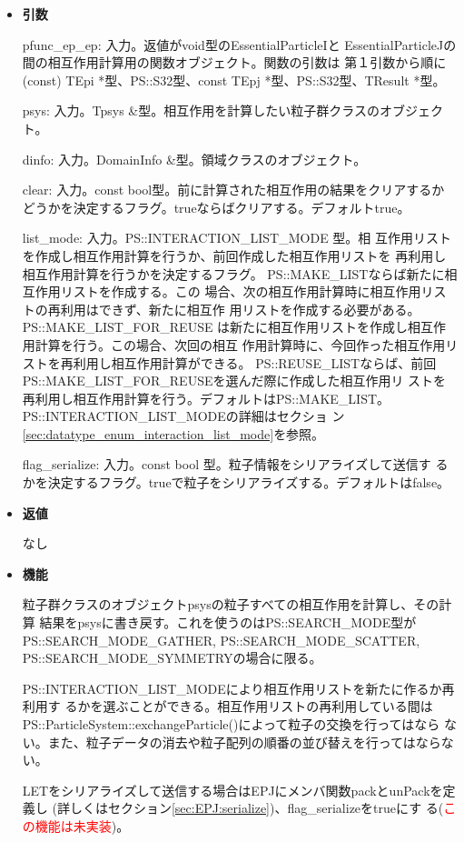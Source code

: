 \begin{itemize}

\item {\bf 引数}

pfunc\_ep\_ep: 入力。返値がvoid型のEssentialParticleIと
EssentialParticleJの間の相互作用計算用の関数オブジェクト。関数の引数は
第１引数から順に(const) TEpi *型、PS::S32型、const
TEpj *型、PS::S32型、TResult *型。

psys: 入力。Tpsys \&型。相互作用を計算したい粒子群クラスのオブジェクト。

dinfo: 入力。DomainInfo \&型。領域クラスのオブジェクト。

clear: 入力。const bool型。前に計算された相互作用の結果をクリアするか
どうかを決定するフラグ。trueならばクリアする。デフォルトtrue。

list\_mode: 入力。PS::INTERACTION\_LIST\_MODE 型。相
互作用リストを作成し相互作用計算を行うか、前回作成した相互作用リストを
再利用し相互作用計算を行うかを決定するフラグ。
PS::MAKE\_LISTならば新たに相互作用リストを作成する。この
場合、次の相互作用計算時に相互作用リストの再利用はできず、新たに相互作
用リストを作成する必要がある。PS::MAKE\_LIST\_FOR\_REUSE
は新たに相互作用リストを作成し相互作用計算を行う。この場合、次回の相互
作用計算時に、今回作った相互作用リストを再利用し相互作用計算ができる。
PS::REUSE\_LISTならば、前回
PS::MAKE\_LIST\_FOR\_REUSEを選んだ際に作成した相互作用リ
ストを再利用し相互作用計算を行う。デフォルトはPS::MAKE\_LIST。
PS::INTERACTION\_LIST\_MODEの詳細はセクショ
ン\ref{sec:datatype_enum_interaction_list_mode}を参照。

flag\_serialize: 入力。const bool 型。粒子情報をシリアライズして送信す
るかを決定するフラグ。trueで粒子をシリアライズする。デフォルトはfalse。

\item {\bf 返値}

なし

\item {\bf 機能}

粒子群クラスのオブジェクトpsysの粒子すべての相互作用を計算し、その計算
結果をpsysに書き戻す。これを使うのはPS::SEARCH\_MODE型が
PS::SEARCH\_MODE\_GATHER, PS::SEARCH\_MODE\_SCATTER,
PS::SEARCH\_MODE\_SYMMETRYの場合に限る。

PS::INTERACTION\_LIST\_MODEにより相互作用リストを新たに作るか再利用す
るかを選ぶことができる。相互作用リストの再利用している間は
PS::ParticleSystem::exchangeParticle()によって粒子の交換を行ってはなら
ない。また、粒子データの消去や粒子配列の順番の並び替えを行ってはならな
い。

LETをシリアライズして送信する場合はEPJにメンバ関数packとunPackを定義し
(詳しくはセクション\ref{sec:EPJ:serialize})、flag\_serializeをtrueにす
る(\textcolor{red}{この機能は未実装})。


\end{itemize}

